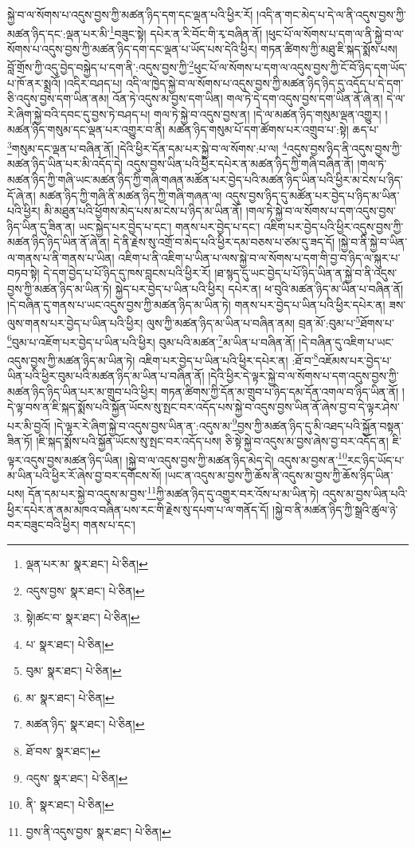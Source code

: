 སྐྱེ་བ་ལ་སོགས་པ་འདུས་བྱས་ཀྱི་མཚན་ཉིད་དག་དང་ལྡན་པའི་ཕྱིར་རོ། །འདི་ན་གང་མེད་པ་དེ་ལ་ནི་འདུས་བྱས་ཀྱི་མཚན་ཉིད་དང་:ལྡན་པར་མི་\footnote{ལྡན་པར་མ་  སྣར་ཐང་།  པེ་ཅིན། }བཟུང་སྟེ། དཔེར་ན་རི་བོང་གི་རྭ་བཞིན་ནོ། །ཕུང་པོ་ལ་སོགས་པ་དག་ལ་ནི་སྐྱེ་བ་ལ་སོགས་པ་འདུས་བྱས་ཀྱི་མཚན་ཉིད་དག་དང་ལྡན་པ་ཡོད་པས་དེའི་ཕྱིར། གཏན་ཚིགས་ཀྱི་མཐུ་ཇི་སྐད་སྨོས་པས། བློ་གྲོས་ཀྱི་འདུ་བྱེད་བསྐྱེད་པ་དག་ནི་:འདུས་བྱས་ཀྱི་\footnote{འདུས་བྱས་  སྣར་ཐང་།  པེ་ཅིན། }ཕུང་པོ་ལ་སོགས་པ་དག་ལ་འདུས་བྱས་ཀྱི་ངོ་བོ་ཉིད་དག་ཡོད་པ་ཁོ་ནར་སྨྲའོ། །འདིར་བཤད་པ། འདི་ལ་ཁྱེད་སྐྱེ་བ་ལ་སོགས་པ་འདུས་བྱས་ཀྱི་མཚན་ཉིད་ཉིད་དུ་འདོད་པ་དེ་དག་ཅི་འདུས་བྱས་དག་ཡིན་ནམ། འོན་ཏེ་འདུས་མ་བྱས་དག་ཡིན། གལ་ཏེ་དེ་དག་འདུས་བྱས་དག་ཡིན་ནོ་ཞེ་ན། དེ་ལ་རེ་ཞིག་སྐྱེ་བའི་དབང་དུ་བྱས་ཏེ་བཤད་པ། གལ་ཏེ་སྐྱེ་བ་འདུས་བྱས་ན། །དེ་ལ་མཚན་ཉིད་གསུམ་ལྡན་འགྱུར། །མཚན་ཉིད་གསུམ་དང་ལྡན་པར་འགྱུར་བ་ནི། མཚན་ཉིད་གསུམ་པོ་དག་ཚོགས་པར་འགྲུབ་པ་:སྟེ། ཆད་པ་\footnote{སྟེ།ཚང་བ་  སྣར་ཐང་།  པེ་ཅིན། }གསུམ་དང་ལྡན་པ་བཞིན་ནོ། །དེའི་ཕྱིར་དོན་དམ་པར་སྐྱེ་བ་ལ་སོགས་:པ་ལ། \footnote{པ་  སྣར་ཐང་།  པེ་ཅིན། }འདུས་བྱས་ཉིད་ནི་འདུས་བྱས་ཀྱི་མཚན་ཉིད་ཡིན་པར་མི་འདོད་དེ། འདུས་བྱས་ཡིན་པའི་ཕྱིར་དཔེར་ན་མཚན་ཉིད་ཀྱི་གཞི་བཞིན་ནོ། །གལ་ཏེ་མཚན་ཉིད་ཀྱི་གཞི་ཡང་མཚན་ཉིད་ཀྱི་གཞི་གཞན་མཚོན་པར་བྱེད་པའི་མཚན་ཉིད་ཡིན་པའི་ཕྱིར་མ་ངེས་པ་ཉིད་དོ་ཞེ་ན། མཚན་ཉིད་ཀྱི་གཞི་ནི་མཚན་ཉིད་ཀྱི་གཞི་གཞན་ལ། འདུས་བྱས་ཉིད་དུ་མཚོན་པར་བྱེད་པ་ཉིད་མ་ཡིན་པའི་ཕྱིར། མི་མཐུན་པའི་ཕྱོགས་མེད་པས་མ་ངེས་པ་ཉིད་མ་ཡིན་ནོ། །གལ་ཏེ་སྐྱེ་བ་ལ་སོགས་པ་དག་འདུས་བྱས་ཉིད་ཡིན་དུ་ཟིན་ན། ཡང་སྐྱེད་པར་བྱེད་པ་དང་། གནས་པར་བྱེད་པ་དང་། འཇིག་པར་བྱེད་པའི་ཕྱིར་འདུས་བྱས་ཀྱི་མཚན་ཉིད་ཉིད་ཡིན་ནོ་ཞེ་ན། དེ་ནི་རྗེས་སུ་འགྲོ་བ་མེད་པའི་ཕྱིར་དམ་བཅས་པ་ཙམ་དུ་ཟད་དོ། །སྐྱེ་བ་ནི་སྐྱེ་བ་ཡིན་ལ་གནས་པ་ནི་གནས་པ་ཡིན། འཇིག་པ་ནི་འཇིག་པ་ཡིན་པ་ལས་སྐྱེ་བ་ལ་སོགས་པ་དག་གི་བྱ་བ་ཉིད་ལ་སྐུར་པ་བཏབ་སྟེ། དེ་དག་བྱེད་པ་པོ་ཉིད་དུ་ཁས་བླངས་པའི་ཕྱིར་རོ། །ཐ་སྙད་དུ་ཡང་བྱེད་པ་པོ་ཉིད་ཡིན་ན་སྐྱེ་བ་ནི་འདུས་བྱས་ཀྱི་མཚན་ཉིད་མ་ཡིན་ཏེ། སྐྱེད་པར་བྱེད་པ་ཡིན་པའི་ཕྱིར། དཔེར་ན། ཕ་བུའི་མཚན་ཉིད་མ་ཡིན་པ་བཞིན་ནོ། །དེ་བཞིན་དུ་གནས་པ་ཡང་འདུས་བྱས་ཀྱི་མཚན་ཉིད་མ་ཡིན་ཏེ། གནས་པར་བྱེད་པ་ཡིན་པའི་ཕྱིར་དཔེར་ན། ཟས་ལུས་གནས་པར་བྱེད་པ་ཡིན་པའི་ཕྱིར། ལུས་ཀྱི་མཚན་ཉིད་མ་ཡིན་པ་བཞིན་ནམ། བྲན་མོ་:བུམ་པ་\footnote{བུམ་  སྣར་ཐང་།  པེ་ཅིན། }ཐོགས་པ་\footnote{མ་  སྣར་ཐང་།  པེ་ཅིན། }བུམ་པ་འཇོག་པར་བྱེད་པ་ཡིན་པའི་ཕྱིར། བུམ་པའི་མཚན་\footnote{མཚན་ཉིད་  སྣར་ཐང་།  པེ་ཅིན། }མ་ཡིན་པ་བཞིན་ནོ། །དེ་བཞིན་དུ་འཇིག་པ་ཡང་འདུས་བྱས་ཀྱི་མཚན་ཉིད་མ་ཡིན་ཏེ། འཇིག་པར་བྱེད་པ་ཡིན་པའི་ཕྱིར་དཔེར་ན། :ཐོ་བ་\footnote{ཐོ་བས་  སྣར་ཐང་། }འཇོམས་པར་བྱེད་པ་ཡིན་པའི་ཕྱིར་བུམ་པའི་མཚན་ཉིད་མ་ཡིན་པ་བཞིན་ནོ། །དེའི་ཕྱིར་དེ་ལྟར་སྐྱེ་བ་ལ་སོགས་པ་དག་འདུས་བྱས་ཀྱི་མཚན་ཉིད་ཉིད་ཡིན་པར་མ་གྲུབ་པའི་ཕྱིར། གཏན་ཚིགས་ཀྱི་དོན་མ་གྲུབ་པ་ཉིད་དམ་དོན་འགལ་བ་ཉིད་ཡིན་ནོ། །དེ་ལྟ་བས་ན་ཇི་སྐད་སྨོས་པའི་སྐྱོན་ཡོངས་སུ་སྤང་བར་འདོད་པས་སྐྱེ་བ་འདུས་བྱས་ཡིན་ནོ་ཞེས་བྱ་བ་དེ་ལྟར་ཤེས་པར་མི་བྱའོ། །དེ་ལྟར་རེ་ཞིག་སྐྱེ་བ་འདུས་བྱས་ཡིན་ན་:འདུས་མ་\footnote{འདུས་  སྣར་ཐང་།  པེ་ཅིན། }བྱས་ཀྱི་མཚན་ཉིད་དུ་མི་འཐད་པའི་སྐྱོན་བསྟན་ཟིན་ཏོ། །ཇི་སྐད་སྨོས་པའི་སྐྱོན་ཡོངས་སུ་སྤང་བར་འདོད་པས། ཅི་སྟེ་སྐྱེ་བ་འདུས་མ་བྱས་ཞེས་བྱ་བར་འདོད་ན། ཇི་ལྟར་འདུས་བྱས་མཚན་ཉིད་ཡིན། །སྐྱེ་བ་ལ་འདུས་བྱས་ཀྱི་མཚན་ཉིད་མེད་དེ། འདུས་མ་བྱས་ན་\footnote{ནི་  སྣར་ཐང་།  པེ་ཅིན། }རང་ཉིད་ཡོད་པ་མ་ཡིན་པའི་ཕྱིར་རོ་ཞེས་བྱ་བར་དགོངས་སོ། །ཡང་ན་འདུས་མ་བྱས་ཀྱི་ཆོས་ནི་འདུས་མ་བྱས་ཀྱི་ཆོས་ཉིད་ཡིན་པས། དོན་དམ་པར་སྐྱེ་བ་འདུས་མ་བྱས་\footnote{བྱས་ནི་འདུས་བྱས་  སྣར་ཐང་།  པེ་ཅིན། }ཀྱི་མཚན་ཉིད་དུ་འགྱུར་བར་འོས་པ་མ་ཡིན་ཏེ། འདུས་མ་བྱས་ཡིན་པའི་ཕྱིར་དཔེར་ན་ནམ་མཁའ་བཞིན་པས་རང་གི་རྗེས་སུ་དཔག་པ་ལ་གནོད་དོ། །སྐྱེ་བ་ནི་མཚན་ཉིད་ཀྱི་སྒྲའི་ཚུལ་ཉེ་བར་བཟུང་བའི་ཕྱིར། གནས་པ་དང་། 